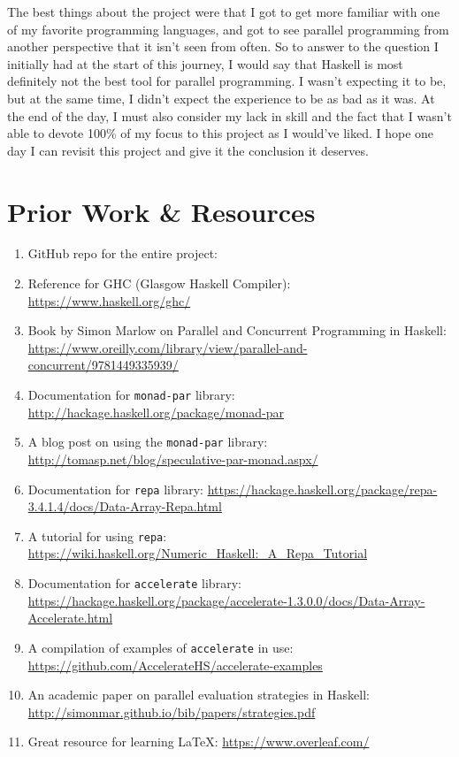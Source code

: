 \documentclass[a4paper, 10pt]{article}
\begin{document}
The best things about the project were that I got to get more familiar with one of my favorite programming languages, and got to see parallel programming from another perspective that it isn't seen from often.
So to answer to the question I initially had at the start of this journey, I would say that Haskell is most definitely not the best tool for parallel programming. I wasn't expecting it to be, but at the same time, I didn't expect the experience to be as bad as it was. At the end of the day, I must also consider my lack in skill and the fact that I wasn't able to devote 100\% of my focus to this project as I would've liked. I hope one day I can revisit this project and give it the conclusion it deserves.


\section{Prior Work \& Resources}

\begin{enumerate}
	\item GitHub repo for the entire project: \url{}
	\item Reference for GHC (Glasgow Haskell Compiler): \url{https://www.haskell.org/ghc/}
	\item Book by Simon Marlow on Parallel and Concurrent Programming in Haskell: \url{https://www.oreilly.com/library/view/parallel-and-concurrent/9781449335939/}
	\item Documentation for \lstinline{monad-par} library: \url{http://hackage.haskell.org/package/monad-par}
	\item A blog post on using the \lstinline{monad-par} library: \url{http://tomasp.net/blog/speculative-par-monad.aspx/}
	\item Documentation for \lstinline{repa} library: \url{https://hackage.haskell.org/package/repa-3.4.1.4/docs/Data-Array-Repa.html}
	\item A tutorial for using \lstinline{repa}: \url{https://wiki.haskell.org/Numeric_Haskell:_A_Repa_Tutorial}
	\item Documentation for \lstinline{accelerate} library: \url{https://hackage.haskell.org/package/accelerate-1.3.0.0/docs/Data-Array-Accelerate.html}
	\item A compilation of examples of \lstinline{accelerate} in use: \url{https://github.com/AccelerateHS/accelerate-examples}
	\item An academic paper on parallel evaluation strategies in Haskell: \url{http://simonmar.github.io/bib/papers/strategies.pdf}
	\item Great resource for learning LaTeX: \url{https://www.overleaf.com/}
\end{enumerate}
\end{document}
